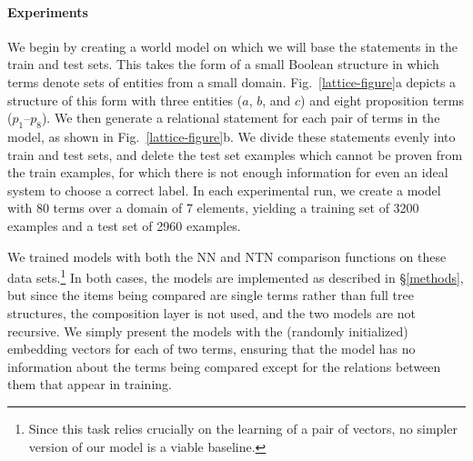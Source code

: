 

\paragraph{Experiments}
We begin by creating a world model
on which we will base the statements in the train and test sets.
This takes the form of a small Boolean structure in which terms denote
sets of entities from a small domain.  Fig.~\ref{lattice-figure}a
depicts a structure of this form with three entities ($a$, $b$, and $c$) and eight proposition terms ($p_1$--$p_8$). We then generate a 
relational statement for each pair of terms in the model, as shown in Fig.~\ref{lattice-figure}b. 
We divide these statements evenly into train and test sets, and delete the test set
 examples which cannot be proven from the train examples, for which there is not enough information for even an ideal system to choose a correct label.
In each experimental run, we create a model with 80 terms over a domain of 7 elements, yielding a training set of 3200 examples and a test set of 
2960 examples.

We trained models with both the NN and NTN comparison functions on these
data sets.\footnote{Since this task relies crucially on the learning of a pair of vectors, no simpler version of our model is a viable baseline.} %
In both cases, the models are implemented as
described in \S\ref{methods}, but since the items being compared
are single terms rather than full tree structures, the composition
layer is not used, and the two models are not recursive. We simply present
the models with the (randomly initialized) embedding vectors for each
of two terms, ensuring that the model has no information about the terms
being compared except for the relations between them that appear in training.



